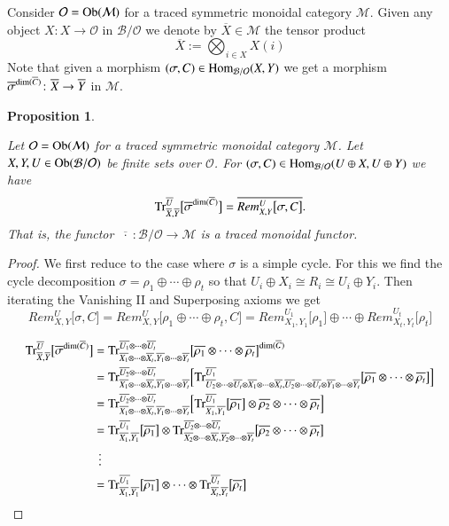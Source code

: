 \documentclass{amsart}
\def\tn{\textnormal}
\def\mc{\mathcal}
\def\Hom{\tn{Hom}}
\def\Ob{\tn{Ob}}
\def\dim{\tn{dim}}
\def\Trace{\tn{Tr}}
\def\to{\rightarrow}
\def\taking{\colon}
\def\ol{\overline}
\def\mcB{\mc{B}}
\def\mcM{\mc{M}}
\def\mcO{\mc{O}}
\newtheorem{proposition}[subsection]{Proposition}
\theoremstyle{remark}
\theoremstyle{definition}
\begin{document}
Consider $\mcO=\Ob(\mcM)$ for a traced symmetric monoidal category $\mcM$. Given any object $X:X\to\mcO$ in $\mcB/\mcO$ we denote by $\ol{X}\in\mcM$ the tensor product 
$$\ol{X}:=\bigotimes_{i\in X}X(i)$$
Note that given a morphism $(\sigma,C)\in\Hom_{\mcB/\mcO}(X,Y)$ we get a morphism $\ol{\sigma}^{\dim(\ol{C})}\taking\ol{X}\to\ol{Y}$ in $\mcM$.

\begin{proposition}\label{prop:trace interactions}

Let $\mcO=\Ob(\mcM)$ for a traced symmetric monoidal category $\mcM$.  Let $X,Y,U\in\Ob(\mcB/\mcO)$ be finite sets over $\mcO$. For $(\sigma,C)\in\Hom_{\mcB/\mcO}(U\oplus X,U\oplus Y)$ we have 
$$\Trace^{\ol{U}}_{\ol{X},\ol{Y}}\big[\ol{\sigma}^{\dim(\ol{C})}\big]=\ol{Rem^U_{X,Y}\big[\sigma,C\big]}.$$
That is, the functor $\ol{\;\cdot\;}\taking\mcB/\mcO\to\mcM$ is a traced monoidal functor.

\end{proposition}

\begin{proof}

We first reduce to the case where $\sigma$ is a simple cycle.  For this we find the cycle decomposition $\sigma=\rho_1\oplus\cdots\oplus\rho_t$ so that $U_i\oplus X_i\cong R_i\cong U_i\oplus Y_i$.  Then iterating the Vanishing II and Superposing axioms we get
\[Rem^U_{X,Y}\big[\sigma,C\big]=Rem^U_{X,Y}\big[\rho_1\oplus\cdots\oplus\rho_t,C\big]=Rem^{U_1}_{X_1,Y_1}\big[\rho_1\big]\oplus\cdots\oplus Rem^{U_t}_{X_t,Y_t}\big[\rho_t\big]\]

\begin{align*}
 \Trace^{\ol{U}}_{\ol{X},\ol{Y}}\big[\ol{\sigma}^{\dim(\ol{C})}\big]
 &=\Trace^{\ol{U_1}\otimes\cdots\otimes\ol{U_t}}_{\ol{X_1}\otimes\cdots\otimes\ol{X_t},\ol{Y_1}\otimes\cdots\otimes\ol{Y_t}}\big[\ol{\rho_1}\otimes\cdots\otimes\ol{\rho_t}\big]^{\dim(\ol{C})}\\
 &=\Trace^{\ol{U_2}\otimes\cdots\otimes\ol{U_t}}_{\ol{X_1}\otimes\cdots\otimes\ol{X_t},\ol{Y_1}\otimes\cdots\otimes\ol{Y_t}}\Big[\Trace^{\ol{U_1}}_{\ol{U_2}\otimes\cdots\otimes\ol{U_t}\otimes\ol{X_1}\otimes\cdots\otimes\ol{X_t},\ol{U_2}\otimes\cdots\otimes\ol{U_t}\otimes\ol{Y_1}\otimes\cdots\otimes\ol{Y_t}}\big[\ol{\rho_1}\otimes\cdots\otimes\ol{\rho_t}\big]\Big]\\
 &=\Trace^{\ol{U_2}\otimes\cdots\otimes\ol{U_t}}_{\ol{X_1}\otimes\cdots\otimes\ol{X_t},\ol{Y_1}\otimes\cdots\otimes\ol{Y_t}}\Big[\Trace^{\ol{U_1}}_{\ol{X_1},\ol{Y_1}}\big[\ol{\rho_1}\big]\otimes\ol{\rho_2}\otimes\cdots\otimes\ol{\rho_t}\Big]\\
 &=\Trace^{\ol{U_1}}_{\ol{X_1},\ol{Y_1}}\big[\ol{\rho_1}\big]\otimes\Trace^{\ol{U_2}\otimes\cdots\otimes\ol{U_t}}_{\ol{X_2}\otimes\cdots\otimes\ol{X_t},\ol{Y_2}\otimes\cdots\otimes\ol{Y_t}}\big[\ol{\rho_2}\otimes\cdots\otimes\ol{\rho_t}\big]\\
 &\ \,\vdots\\
 &=\Trace^{\ol{U_1}}_{\ol{X_1},\ol{Y_1}}\big[\ol{\rho_1}\big]\otimes\cdots\otimes\Trace^{\ol{U_t}}_{\ol{X_t},\ol{Y_t}}\big[\ol{\rho_t}\big]
\end{align*}

\end{proof}
\end{document}

